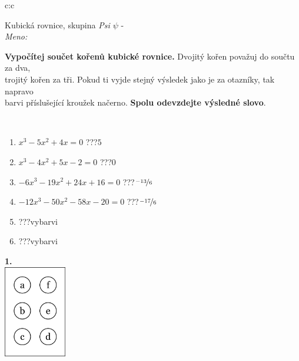 \documentclass[10pt]{report}
\begin{document}
\begin{tabular}{c:c}
\begin{minipage}[c][104.5mm][t]{0.5\linewidth}
\begin{center}
\vspace{7mm}
{\huge Kubická rovnice, skupina \textit{Psi $\psi$} -}\\[5mm]
\textit{Meno:}\phantom{xxxxxxxxxxxxxxxxxxxxxxxxxxxxxxxxxxxxxxxxxxxxxxxxxxxxxxxxxxxxxxxxx}\\[5mm]
\begin{minipage}{0.95\linewidth}
\textbf{Vypočítej součet kořenů kubické rovnice.} Dvojitý kořen považuj do součtu za dva,\\trojitý kořen za tři. Pokud ti vyjde stejný výsledek jako je za otazníky, tak napravo\\barvi příslušející kroužek načerno. \textbf{Spolu odevzdejte výsledné slovo}.
\end{minipage}
\\[1mm]
\begin{minipage}{0.79\linewidth}
\begin{center}
\begin{varwidth}{\linewidth}
\begin{enumerate}
\Large
\item $x^3-5x^2+4x=0$\quad \dotfill\; ???\;\dotfill \quad $5$
\item $x^3-4x^2+5x-2=0$\quad \dotfill\; ???\;\dotfill \quad $0$
\item $-6x^3-19x^2+24x+16=0$\quad \dotfill\; ???\;\dotfill \quad $\nicefrac{-13}{6}$
\item $-12x^3-50x^2-58x-20=0$\quad \dotfill\; ???\;\dotfill \quad $\nicefrac{-17}{6}$
\item \quad \dotfill\; ???\;\dotfill \quad vybarvi
\item \quad \dotfill\; ???\;\dotfill \quad vybarvi
\end{enumerate}
\end{varwidth}
\end{center}
\end{minipage}
\begin{minipage}{0.20\linewidth}
\begin{center}
{\Huge\bfseries 1.} \\[2mm]
\includegraphics[height=40mm]{../images/braille.png}

\end{center}
\end{minipage}
\end{center}
\end{minipage}
\end{tabular}
\end{document}
